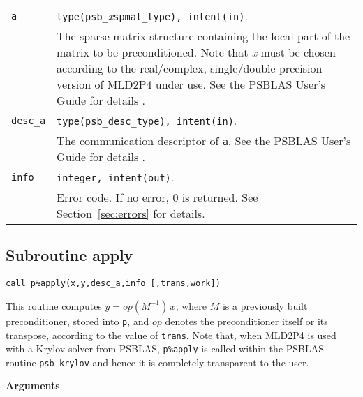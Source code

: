 \begin{tabular}{p{1.2cm}p{12cm}}
\verb|a|      & \verb|type(psb_|\emph{x}\verb|spmat_type), intent(in)|. \\
              & The sparse matrix structure containing the local part of the
                matrix to be preconditioned. Note that \emph{x} must be chosen according
                to the real/complex, single/double precision version of MLD2P4 under use.
                See the PSBLAS User's Guide for details \cite{PSBLASGUIDE}.\\
\verb|desc_a| & \verb|type(psb_desc_type), intent(in)|. \\
              & The communication descriptor of \verb|a|. See the PSBLAS User's Guide for
                details \cite{PSBLASGUIDE}.\\
\verb|info|   & \verb|integer, intent(out)|.\\
              & Error code. If no error, 0 is returned. See Section~\ref{sec:errors} for details.\\
\end{tabular}

\clearpage
\subsection{Subroutine apply\label{sec:precapply}}

\begin{center}
\verb|call p%apply(x,y,desc_a,info [,trans,work])|\\
\end{center}

\noindent
This routine computes $y = op(M^{-1})\, x$, where $M$ is a previously built
preconditioner, stored into \verb|p|, and $op$
denotes the preconditioner itself or its transpose, according to
the value of \verb|trans|.
Note that, when MLD2P4 is used with a Krylov solver from PSBLAS,
\verb|p%apply| is called within the PSBLAS routine \verb|psb_krylov|
and hence it is completely transparent to the user.

{\baselineskip\noindent\large\bfseries Arguments} \smallskip

